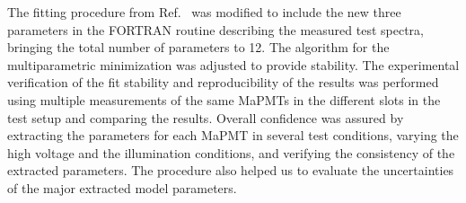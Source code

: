 The fitting procedure from Ref.~\cite{DEGTIARENKO20171} was modified to include the new three parameters in the FORTRAN routine describing the measured test spectra, bringing the total number of parameters to 12. The algorithm for the multiparametric minimization was adjusted to provide stability. The experimental verification of the fit stability and reproducibility of the results was performed using multiple measurements of the same MaPMTs in the different slots in the test setup and comparing the results. Overall confidence was assured by extracting the parameters for each MaPMT in several test conditions, varying the high voltage and the illumination conditions, and verifying the consistency of the extracted parameters. The procedure also helped us to evaluate the uncertainties of the major extracted model parameters.
